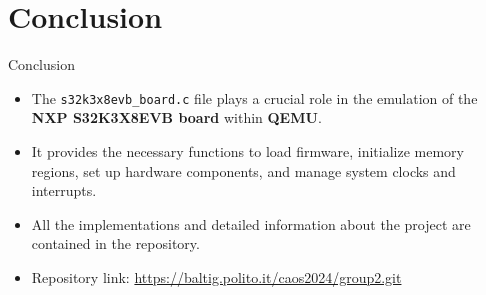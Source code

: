 
\section{Conclusion}

\begin{frame}{Conclusion}
    \begin{itemize}
        \item The \texttt{s32k3x8evb\_board.c} file plays a crucial role in the emulation of the \textbf{NXP S32K3X8EVB board} within \textbf{QEMU}.
        \item It provides the necessary functions to load firmware, initialize memory regions, set up hardware components, and manage system clocks and interrupts.
        \item All the implementations and detailed information about the project are contained in the repository.
        \item Repository link: \url{https://baltig.polito.it/caos2024/group2.git}
    \end{itemize}
\end{frame}
